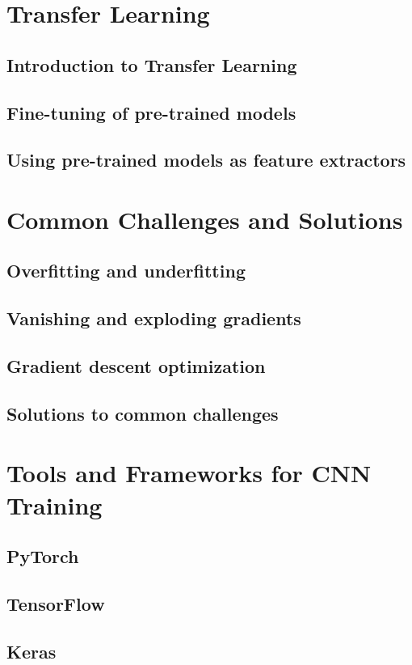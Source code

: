 \chapter{Transfer Learning}

\section{Introduction to Transfer Learning}
\section{Fine-tuning of pre-trained models}
\section{Using pre-trained models as feature extractors}

\chapter{Common Challenges and Solutions}

\section{Overfitting and underfitting}
\section{Vanishing and exploding gradients}
\section{Gradient descent optimization}
\section{Solutions to common challenges}

\chapter{Tools and Frameworks for CNN Training}

\section{PyTorch}
\section{TensorFlow}
\section{Keras}
